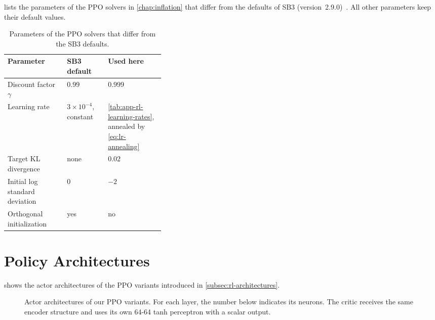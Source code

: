  lists the parameters of the PPO solvers in \cref{chap:inflation} that differ
from the defaults of SB3 (version~2.9.0)~\cite{StableBaselines2026PPO,StableBaselines2026Policy,StableBaselines2026VecNormalize}.
All other parameters keep their default values.
\begin{table}[htbp]
  \centering
  \caption{Parameters of the PPO solvers that differ from the SB3 defaults.}
  \label{tab:app-rl-sb3-parameters}
  \begin{tabular}{@{}llp{0.36\linewidth}@{}}
    \toprule
    Parameter & SB3 default & Used here \\
    \midrule
    Discount factor $\gamma$ & $0.99$ & $0.999$ \\
    Learning rate & $3 \times 10^{-4}$, constant & \cref{tab:app-rl-learning-rates}, annealed by \eqref{eq:lr-annealing} \\
    Target KL divergence & none & $0.02$ \\
    Initial log standard deviation & $0$ & $-2$ \\
    Orthogonal initialization & yes & no \\
    \bottomrule
  \end{tabular}
\end{table}

\section{Policy Architectures}
\label{sec:app-ppo-architectures}

 shows the actor architectures of the PPO variants introduced in \cref{subsec:rl-architectures}.

\begin{figure}[htbp]
    \centering
    
    \caption{Actor architectures of our PPO variants. For each layer, the number below indicates its neurons.
    The critic receives the same encoder structure and uses its own 64-64 tanh perceptron with a scalar output.}
    \label{fig:ppo-architectures}
\end{figure}
